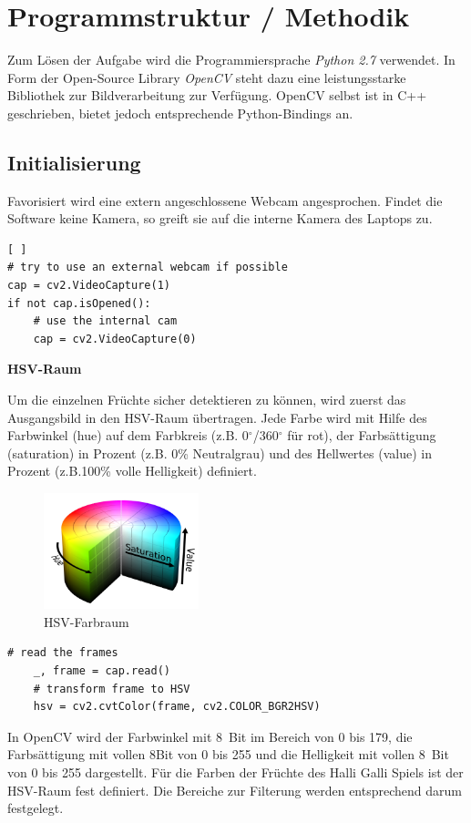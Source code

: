
\section{Programmstruktur / Methodik}
\label{sec:Programmstruktur}

Zum Lösen der Aufgabe wird die Programmiersprache \emph{Python 2.7} verwendet. In Form der Open-Source Library \emph{OpenCV} steht dazu eine leistungsstarke Bibliothek zur Bildverarbeitung zur Verfügung.
OpenCV selbst ist in C++ geschrieben, bietet jedoch entsprechende Python-Bindings an.


\subsection{Initialisierung}

Favorisiert wird eine extern angeschlossene Webcam angesprochen. Findet die Software keine Kamera, so greift sie auf die interne Kamera des Laptops zu. 

\lstset{language=Python}
\begin{lstlisting}[ ]
# try to use an external webcam if possible
cap = cv2.VideoCapture(1)
if not cap.isOpened():
    # use the internal cam
    cap = cv2.VideoCapture(0)
\end{lstlisting}

\textbf{HSV-Raum}

Um die einzelnen Früchte sicher detektieren zu können, wird zuerst das Ausgangsbild in den HSV-Raum übertragen. Jede Farbe wird mit Hilfe des Farbwinkel (hue) auf dem Farbkreis (z.B. 0$^\circ$/360$^\circ$  für rot), der Farbsättigung (saturation) in Prozent (z.B. 0\% Neutralgrau) und des Hellwertes (value) in Prozent (z.B.100\% volle Helligkeit) definiert.
\begin{figure}[H]
    \centering
    \includegraphics[width=0.4\textwidth]{Abbildungen/HSV_color}
    \caption[HSV]{HSV-Farbraum}
    \label{fig:HSV-Farbraum}
\end{figure}
\lstset{language=Python}
\begin{lstlisting}[]
    # read the frames
    _, frame = cap.read()
    # transform frame to HSV
    hsv = cv2.cvtColor(frame, cv2.COLOR_BGR2HSV)
\end{lstlisting}
In OpenCV wird der Farbwinkel mit 8~Bit im Bereich von 0 bis 179, die Farbsättigung mit vollen 8Bit von 0 bis 255 und die Helligkeit mit vollen 8~Bit von 0 bis 255 dargestellt.
Für die Farben der Früchte des Halli Galli Spiels ist der HSV-Raum fest definiert. Die Bereiche zur Filterung werden entsprechend darum festgelegt. 

